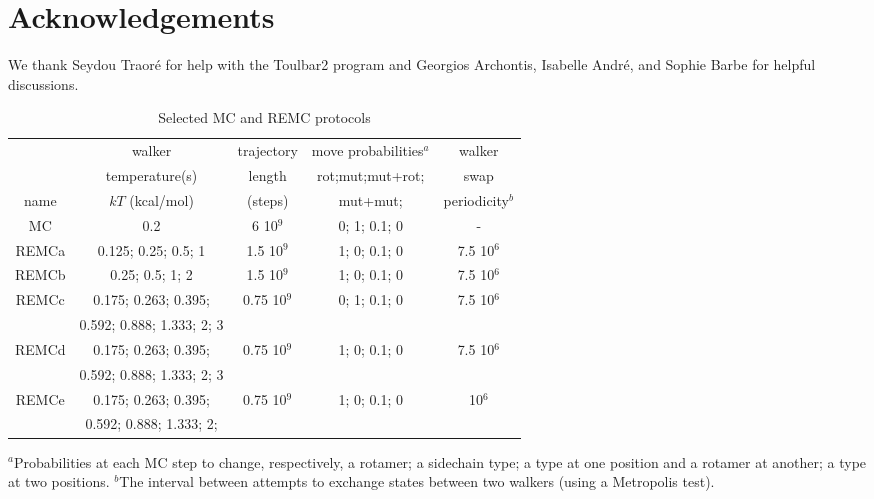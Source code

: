 \documentclass[a4paper,12pt]{article}
\begin{document}
\section*{Acknowledgements}
We thank Seydou Traor\'e for help with the Toulbar2 program and Georgios Archontis, Isabelle Andr\'e, and Sophie Barbe
for helpful discussions.

\small 


\begin{table}[H]                            
\caption{Selected MC and REMC protocols}
\label{tab:parameters}                      
\begin{center} \small 
\renewcommand{\arraystretch}{0.75}
\begin{tabular}{ccccc} \hline \hline  
      &  walker                   & trajectory & move probabilities$^a$ & walker     \\ 
      &  temperature(s)           & length     & rot;mut;mut+rot; & swap       \\ 
name  & $kT$ (kcal/mol)           & (steps)    & mut+mut;         & periodicity$^b$ \smallskip \\  \hline 
MC    & 0.2                       &   6 10$^9$ & 0; 1; 0.1; 0     &  -          \smallskip \\      
REMCa & 0.125; 0.25; 0.5; 1       & 1.5 10$^9$ & 1; 0; 0.1; 0     & 7.5 10$^6$  \smallskip \\   
REMCb & 0.25; 0.5; 1; 2           & 1.5 10$^9$ & 1; 0; 0.1; 0     & 7.5 10$^6$  \smallskip \\ 
REMCc & 0.175; 0.263; 0.395;      & 0.75 10$^9$& 0; 1; 0.1; 0     & 7.5 10$^6$  \\
      & 0.592; 0.888; 1.333; 2; 3 &  &  &  \smallskip \\
REMCd & 0.175; 0.263; 0.395;      &0.75 10$^9$ & 1; 0; 0.1; 0     & 7.5 10$^6$  \\
      & 0.592; 0.888; 1.333; 2; 3 &  &  &  \smallskip \\
REMCe & 0.175; 0.263; 0.395;      &0.75 10$^9$ & 1; 0; 0.1; 0     &     10$^6$  \\ 
      & 0.592; 0.888; 1.333; 2;   &  &  &  \smallskip \\ \hline
\end{tabular}
\end{center}
{\small \noindent $^a$Probabilities at each MC step to change, respectively, a
rotamer; a sidechain type; a type at one position and a rotamer at another;
a type at two positions. $^b$The interval between attempts to exchange states
between two walkers (using a Metropolis test).
}
\end{table}
\end{document}
